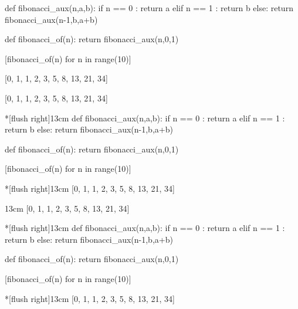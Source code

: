 \documentclass[english,11pt,a4paper]{article}
\begin{document}
\pagebreak

\begin{NotebookIn}{\linewidth}
def fibonacci_aux(n,a,b):
	if n == 0 :
		return a
	elif n == 1 :
		return b
	else:
		return fibonacci_aux(n-1,b,a+b)

def fibonacci_of(n):
	return fibonacci_aux(n,0,1)

[fibonacci_of(n) for n in range(10)]
\end{NotebookIn}

\begin{NotebookOut}{\linewidth}
[0, 1, 1, 2, 3, 5, 8, 13, 21, 34]
\end{NotebookOut}

\begin{NotebookConsole}{\linewidth}
[0, 1, 1, 2, 3, 5, 8, 13, 21, 34]
\end{NotebookConsole}

\begin{codehigh}[language=latex/latex2,style/main=cyan!10,style/code=cyan!10]
\begin{NotebookIn}*[flush right]{13cm}
def fibonacci_aux(n,a,b):
  if n == 0 :
    return a
  elif n == 1 :
    return b
  else:
    return fibonacci_aux(n-1,b,a+b)

def fibonacci_of(n):
  return fibonacci_aux(n,0,1)

[fibonacci_of(n) for n in range(10)]
\end{NotebookIn}

\begin{NotebookOut}*[flush right]{13cm}
[0, 1, 1, 2, 3, 5, 8, 13, 21, 34]
\end{NotebookOut}

\begin{NotebookConsole}{13cm}
[0, 1, 1, 2, 3, 5, 8, 13, 21, 34]
\end{NotebookConsole}
\end{codehigh}

\begin{NotebookIn}*[flush right]{13cm}
def fibonacci_aux(n,a,b):
	if n == 0 :
		return a
	elif n == 1 :
		return b
	else:
		return fibonacci_aux(n-1,b,a+b)

def fibonacci_of(n):
	return fibonacci_aux(n,0,1)

[fibonacci_of(n) for n in range(10)]
\end{NotebookIn}

\begin{NotebookOut}*[flush right]{13cm}
[0, 1, 1, 2, 3, 5, 8, 13, 21, 34]
\end{NotebookOut}
\end{document}
